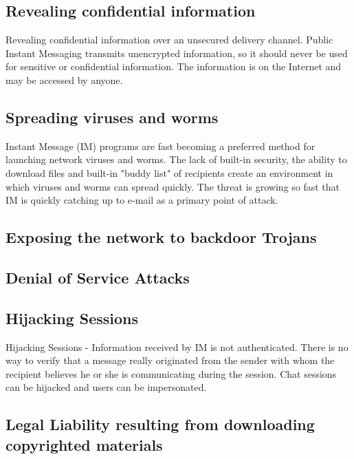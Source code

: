 \subsection{Revealing confidential information}\label{subsec:revealing-confidential-information}
Revealing confidential information over an unsecured delivery channel.
Public Instant Messaging transmits unencrypted information, so it should never be used for sensitive or confidential information.
The information is on the Internet and may be accessed by anyone.

\subsection{Spreading viruses and worms}\label{subsec:spreading-viruses-and-worms}
Instant Message (IM) programs are fast becoming a preferred method for launching network viruses and worms.
The lack of built-in security, the ability to download files and built-in "buddy list" of recipients create an
environment in which viruses and worms can spread quickly.
The threat is growing so fast that IM is quickly catching up to e-mail as a primary point of attack.

\subsection{Exposing the network to backdoor Trojans}\label{subsec:exposing-the-network-to-backdoor-trojans}

\subsection{Denial of Service Attacks}\label{subsec:denial-of-service-attacks}

\subsection{Hijacking Sessions}\label{subsec:hijacking-sessions}
Hijacking Sessions - Information received by IM is not authenticated.
There is no way to verify that a message really originated from the sender with whom the recipient
believes he or she is communicating during the session.
Chat sessions can be hijacked and users can be impersonated.

\subsection{Legal Liability resulting from downloading copyrighted materials}\label{subsec:legal-liability-resulting-from-downloading-copyrighted-materials}


